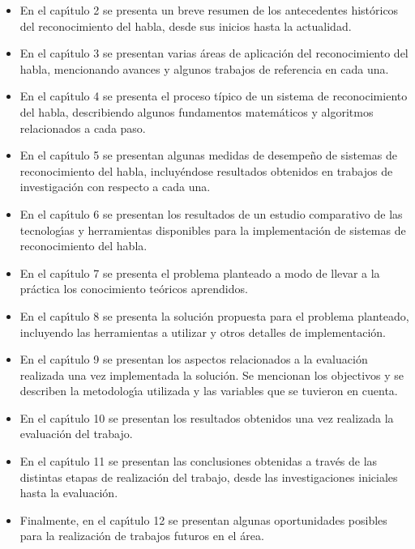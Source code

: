 \begin{itemize}
	\item En el cap{\'\i}tulo 2 se presenta un breve resumen de los antecedentes hist\'oricos del reconocimiento
	del habla, desde sus inicios hasta la actualidad.
	\item En el cap{\'\i}tulo 3 se presentan varias \'areas de aplicaci\'on del reconocimiento del habla, 
	mencionando avances y algunos trabajos de referencia en cada una.
	\item En el cap{\'\i}tulo 4 se presenta el proceso t\'{i}pico de un sistema de reconocimiento del habla,
	describiendo algunos fundamentos matem\'aticos y algoritmos relacionados a cada paso.
	\item En el cap{\'\i}tulo 5 se presentan algunas medidas de desempe\~no de sistemas de reconocimiento del
	habla, incluy\'endose resultados obtenidos en trabajos de investigaci\'on con respecto a cada una.
	\item En el cap{\'\i}tulo 6 se presentan los resultados de un estudio comparativo de las tecnolog{\'\i}as
	y herramientas disponibles para la implementaci\'on de sistemas de reconocimiento del habla.
	\item En el cap{\'\i}tulo 7 se presenta el problema planteado a modo de llevar a la pr\'actica los
	conocimiento te\'oricos aprendidos.
	\item En el cap{\'\i}tulo 8 se presenta la soluci\'on propuesta para el problema planteado, incluyendo
	las herramientas a utilizar y otros detalles de implementaci\'on.
	\item En el cap{\'\i}tulo 9 se presentan los aspectos relacionados a la evaluaci\'on realizada una vez
	implementada la soluci\'on. Se mencionan los objectivos y se describen la metodolog{\'\i}a utilizada
	y las variables que se tuvieron en cuenta.
	\item En el cap{\'\i}tulo 10 se presentan los resultados obtenidos una vez realizada la evaluaci\'on
	del trabajo.
	\item En el cap{\'\i}tulo 11 se presentan las conclusiones obtenidas a trav\'es de las distintas
	etapas de realizaci\'on del trabajo, desde las investigaciones iniciales hasta la evaluaci\'on.
	\item Finalmente, en el cap{\'\i}tulo 12 se presentan algunas oportunidades posibles para
	la realizaci\'on de trabajos futuros en el \'area.
\end{itemize}